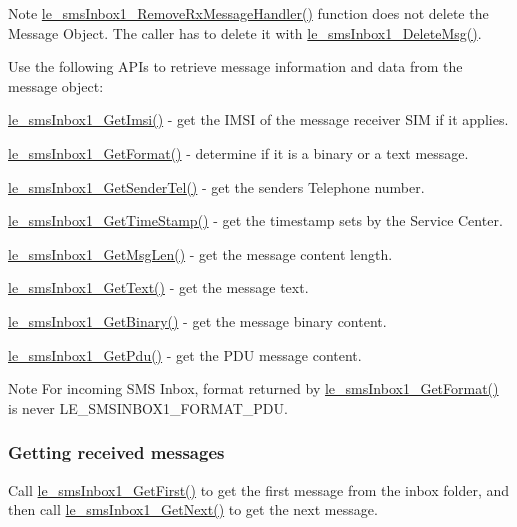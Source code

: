 \begin{DoxyNote}{Note}
\hyperlink{le__sms_inbox1__interface_8h_a58587948e7bf5612bcb38164edfa4fee}{le\+\_\+sms\+Inbox1\+\_\+\+Remove\+Rx\+Message\+Handler()} function does not delete the Message Object. The caller has to delete it with \hyperlink{le__sms_inbox1__interface_8h_a2a426505848863678403f5b14c2ce16c}{le\+\_\+sms\+Inbox1\+\_\+\+Delete\+Msg()}.
\end{DoxyNote}
Use the following A\+P\+Is to retrieve message information and data from the message object\+:
\begin{DoxyItemize}
\item \hyperlink{le__sms_inbox1__interface_8h_a47b7188457df57060544353824a722e5}{le\+\_\+sms\+Inbox1\+\_\+\+Get\+Imsi()} -\/ get the I\+M\+S\+I of the message receiver S\+I\+M if it applies.
\item \hyperlink{le__sms_inbox1__interface_8h_a7daf191029452574c2f73be31745ddd5}{le\+\_\+sms\+Inbox1\+\_\+\+Get\+Format()} -\/ determine if it is a binary or a text message.
\item \hyperlink{le__sms_inbox1__interface_8h_a526785c35a6dcaabaff01b3959b25eb4}{le\+\_\+sms\+Inbox1\+\_\+\+Get\+Sender\+Tel()} -\/ get the sender\textquotesingle{}s Telephone number.
\item \hyperlink{le__sms_inbox1__interface_8h_aea859f08a7d8115d4839a59ce1be987c}{le\+\_\+sms\+Inbox1\+\_\+\+Get\+Time\+Stamp()} -\/ get the timestamp sets by the Service Center.
\item \hyperlink{le__sms_inbox1__interface_8h_a99ac3b4b8d886a2c797c221a00f01bd6}{le\+\_\+sms\+Inbox1\+\_\+\+Get\+Msg\+Len()} -\/ get the message content length.
\item \hyperlink{le__sms_inbox1__interface_8h_aa35b73bd6e76889b4ab93e021e14c7a6}{le\+\_\+sms\+Inbox1\+\_\+\+Get\+Text()} -\/ get the message text.
\item \hyperlink{le__sms_inbox1__interface_8h_a74a7caad34f457e0c3fb5a741f5089ae}{le\+\_\+sms\+Inbox1\+\_\+\+Get\+Binary()} -\/ get the message binary content.
\item \hyperlink{le__sms_inbox1__interface_8h_ac1f8f65a60e406752394499ee3d60883}{le\+\_\+sms\+Inbox1\+\_\+\+Get\+Pdu()} -\/ get the P\+D\+U message content.
\end{DoxyItemize}

\begin{DoxyNote}{Note}
For incoming S\+M\+S Inbox, format returned by \hyperlink{le__sms_inbox1__interface_8h_a7daf191029452574c2f73be31745ddd5}{le\+\_\+sms\+Inbox1\+\_\+\+Get\+Format()} is never L\+E\+\_\+\+S\+M\+S\+I\+N\+B\+O\+X1\+\_\+\+F\+O\+R\+M\+A\+T\+\_\+\+P\+D\+U.
\end{DoxyNote}
\hypertarget{c_sms_inbox_le_smsInbox_listing}{}\subsubsection{Getting received messages}\label{c_sms_inbox_le_smsInbox_listing}
Call \hyperlink{le__sms_inbox1__interface_8h_ae63652bebbdb65a29212bb7d5636b025}{le\+\_\+sms\+Inbox1\+\_\+\+Get\+First()} to get the first message from the inbox folder, and then call \hyperlink{le__sms_inbox1__interface_8h_a605986f7e80b0686841e9b3b5e9b2802}{le\+\_\+sms\+Inbox1\+\_\+\+Get\+Next()} to get the next message.

